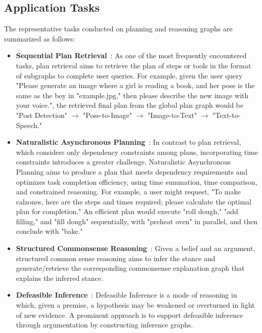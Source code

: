 \subsection{Application Tasks}
The representative tasks conducted on planning and reasoning graphs are summarized as follows:
\begin{itemize}[leftmargin=*]
    \item \textbf{Sequential Plan Retrieval}~\cite{shen2024hugginggpt, shen2023taskbench, song2023restgpt, wu2024can, zhao2024large}:
    As one of the most frequently encountered tasks, plan retrieval aims to retrieve the plan of steps or tools in the format of subgraphs to complete user queries. For example, given the user query "Please generate an image where a girl is reading a book, and her pose is the same as the boy in "example.jpg," then please describe the new image with your voice.", the retrieved final plan from the global plan graph would be "Post Detection" $\rightarrow$ "Pose-to-Image" $\rightarrow$ "Image-to-Text" $\rightarrow$ "Text-to-Speech."

    \item \textbf{Naturalistic Asynchronous Planning}~\cite{lin2024graph}: In contrast to plan retrieval, which considers only dependency constraints among plans, incorporating time constraints introduces a greater challenge. Naturalistic Asynchronous Planning aims to produce a plan that meets dependency requirements and optimizes task completion efficiency, using time summation, time comparison, and constrained reasoning. For example, a user might request, "To make calzones, here are the steps and times required; please calculate the optimal plan for completion." An efficient plan would execute "roll dough," "add filling," and "fill dough" sequentially, with "preheat oven" in parallel, and then conclude with "bake."


    \item \textbf{Structured Commonsense Reasoning}~\cite{saha2021explagraphs}: Given a belief and an argument, structured common sense reasoning aims to infer the stance and generate/retrieve the corresponding commonsense explanation graph that explains the inferred stance. 

    \item \textbf{Defeasible Inference}~\cite{madaan2021could}: Defeasible Inference is a mode of reasoning in which, given a premise, a hypothesis may be weakened or overturned in light of new evidence. A prominent approach is to support defeasible inference through argumentation by constructing inference graphs.


\end{itemize}
